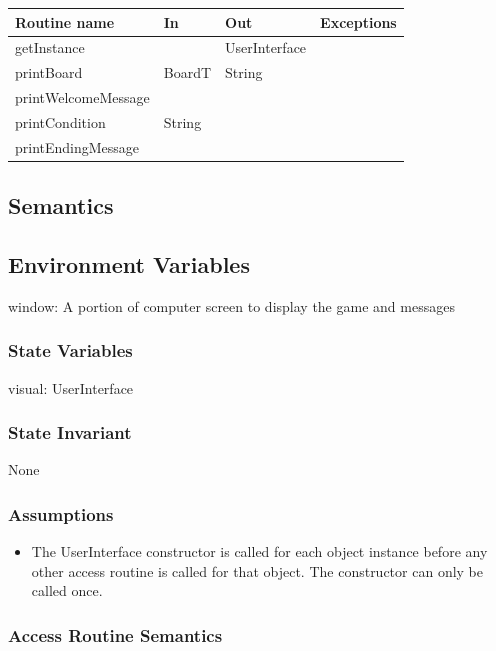 \documentclass[12pt]{article}
\begin{document}
\begin{tabular}{| l | l | l | p{6cm} |}
\hline
\textbf{Routine name} & \textbf{In} & \textbf{Out} & \textbf{Exceptions}\\
\hline
getInstance & ~ & UserInterface &  \\
\hline
printBoard & BoardT & String & \\
\hline
printWelcomeMessage & ~ & ~ & \\
\hline
printCondition & String & ~ & \\
\hline
printEndingMessage & ~ & ~ & \\
\hline
\end{tabular}

\subsection* {Semantics}

\subsection*{Environment Variables}

window: A portion of computer screen to display the game and messages

\subsubsection* {State Variables}

visual: UserInterface

\subsubsection* {State Invariant}

None

\newpage

\subsubsection* {Assumptions}

\begin{itemize}
\item The UserInterface constructor is called for each object instance before any
other access routine is called for that object.  The constructor can only be
called once.
\end{itemize}


\subsubsection* {Access Routine Semantics}
\end{document}
